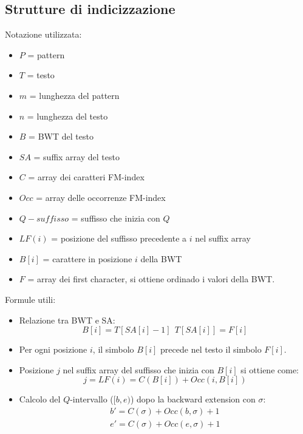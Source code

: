 \subsection{Strutture di indicizzazione}
Notazione utilizzata:
\begin{itemize}
    \item $P$ = pattern
    \item $T$ = testo
    \item $m$ = lunghezza del pattern
    \item $n$ = lunghezza del testo
    \item $B$ = BWT del testo
    \item $SA$ = suffix array del testo
    \item $C$ = array dei caratteri FM-index
    \item $Occ$ = array delle occorrenze FM-index
    \item $Q-suffisso$ = suffisso che inizia con $Q$
    \item $LF(i)$ = posizione del suffisso precedente a $i$ nel suffix array
    \item $B[i]$ = carattere in posizione $i$ della BWT
    \item $F$ = array dei first character, si ottiene ordinado i valori della BWT.
\end{itemize}
Formule utili:
\begin{itemize}
    \item Relazione tra BWT e SA:
          \begin{equation}
              B[i] = T[SA[i] - 1] \ \ T[SA[i]] = F[i]
          \end{equation}
    \item Per ogni posizione $i$, il simbolo $B[i]$ precede nel testo il simbolo $F[i]$.
    \item Posizione $j$ nel suffix array del suffisso che inizia con $B[i]$ si ottiene come:
          \begin{equation}
              j = LF(i) = C(B[i]) + Occ(i, B[i])
          \end{equation}
    \item Calcolo del $Q$-intervallo ($[b, e)$) dopo la backward extension con
          $\sigma$:
          \begin{equation}
              \begin{array}{l}
                  b' = C(\sigma) + Occ(b, \sigma) + 1 \\
                  e' = C(\sigma) + Occ(e, \sigma) + 1
              \end{array}
          \end{equation}
\end{itemize}